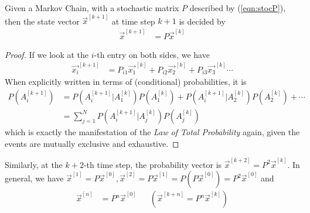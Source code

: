 \begin{proper}
Given a Markov Chain, with a stochastic matrix $P$ described by (\ref{eqn:stocP}), then the state vector $\vec{x}^{[k+1]}$ at time step $k+1$ is decided by
\begin{align}
\vec{x}^{[k+1]} &= P\vec{x}^{[k]}   
\end{align}
\end{proper}
\begin{proof}
If we look at the $i$-th entry on both sides, we have
\begin{align*}
\vec{x_i}^{[k+1]} &= P_{i1} \vec{x_1}^{[k]} + P_{i2} \vec{x_2}^{[k]} + P_{i3} \vec{x_3}^{[k]} \cdots 
\end{align*}
When explicitly written in terms of (conditional) probabilities, it is
\begin{align*}
P(A_i^{[k+1]}) &= P(A_i^{[k+1]}|A_1^{[k]}) P(A_1^{[k]}) + P(A_i^{[k+1]}|A_2^{[k]}) P(A_2^{[k]}) + \cdots \\
&= \sum_{j=1}^N P(A_i^{[k+1]}|A_j^{[k]}) P(A_j^{[k]})
\end{align*}
which is exactly the manifestation of the \textit{Law of Total Probability} again, given the events are mutually exclusive and exhaustive.
\end{proof} 
Similarly, at the $k+2$-th time step, the probability vector is $\vec{x}^{[k+2]} = P^2\vec{x}^{[k]}$. In general, we have $\vec{x}^{[1]} = P\vec{x}^{[0]}, \vec{x}^{[2]} = P\vec{x}^{[1]} = P(P\vec{x}^{[0]}) = P^2\vec{x}^{[0]}$ and 
\begin{align}
\vec{x}^{[n]} &= P^n\vec{x}^{[0]} & & (\vec{x}^{[k+n]} = P^n\vec{x}^{[k]})  \label{eqn:markovpredict}
\end{align}

